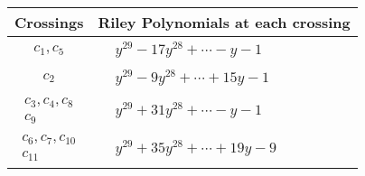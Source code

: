 \documentclass[1p]{elsarticle_modified}
\theoremstyle{definition}
\begin{document}
\begin{tabular}{m{50pt}|m{274pt}}
Crossings & \hspace{64pt}Riley Polynomials at each crossing \\
\hline $$\begin{aligned}c_{1},c_{5}\end{aligned}$$&$\begin{aligned}
&y^{29}-17 y^{28}+\cdots- y-1
\end{aligned}$\\
\hline $$\begin{aligned}c_{2}\end{aligned}$$&$\begin{aligned}
&y^{29}-9 y^{28}+\cdots+15 y-1
\end{aligned}$\\
\hline $$\begin{aligned}c_{3},c_{4},c_{8}\\c_{9}\end{aligned}$$&$\begin{aligned}
&y^{29}+31 y^{28}+\cdots- y-1
\end{aligned}$\\
\hline $$\begin{aligned}c_{6},c_{7},c_{10}\\c_{11}\end{aligned}$$&$\begin{aligned}
&y^{29}+35 y^{28}+\cdots+19 y-9
\end{aligned}$\\
\hline
\end{tabular}
\vskip 2pc
\end{document}
